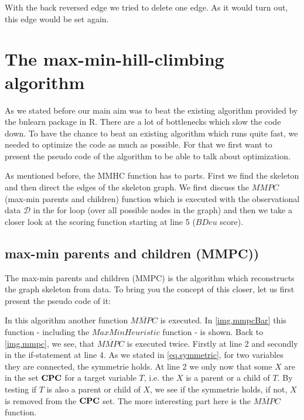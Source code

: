 			With the back reversed edge we tried to delete one edge. As it would turn out, this edge would be set again.
			 \label{img.delete}
			

\chapter{The max-min-hill-climbing algorithm}

	As we stated before our main aim was to beat the existing algorithm provided by the bnlearn package in R. There are a lot of bottlenecks which slow the code down. To have the chance to beat an existing algorithm which runs quite fast, we needed to optimize the code as much as possible. For that we first want to present the pseudo code of the algorithm to be able to talk about optimization.

	 \label{img.mmhc}

	As mentioned before, the MMHC function has to parts. First we find the skeleton and then direct the edges of the skeleton graph. We first discuss the $MMPC$ (max-min parents and children) function which is executed with the observational data $\mathcal{D}$ in the for loop (over all possible nodes in the graph) and then we take a closer look at the scoring function starting at line 5 ($BDeu$ score).

		\section{max-min parents and children (MMPC))}

			The max-min parents and children (MMPC) is the algorithm which reconstructs the graph skeleton from data. To bring you the concept of this closer, let us first present the pseudo code of it:

			 \label{img.mmpc}

			In this algorithm another function $\overline{MMPC}$ is executed. In \autoref{img.mmpcBar} this function - including the $MaxMinHeuristic$ function - is shown. Back to \autoref{img.mmpc}, we see, that $\overline{MMPC}$ is executed twice. Firstly at line 2 and secondly in the if-statement at line 4. As we stated in \autoref{eq.symmetric}, for two variables they are connected, the symmetrie holds. At line 2 we only now that some $X$ are in the set ${\textbf{CPC}}$ for a target variable $T$, i.e. the $X$ is a parent or a child of $T$. By testing if $T$ is also a parent or child of $X$, we see if the symmetrie holds, if not, $X$ is removed from the ${\textbf{CPC}}$ set. The more interesting part here is the $\overline{MMPC}$ function.

